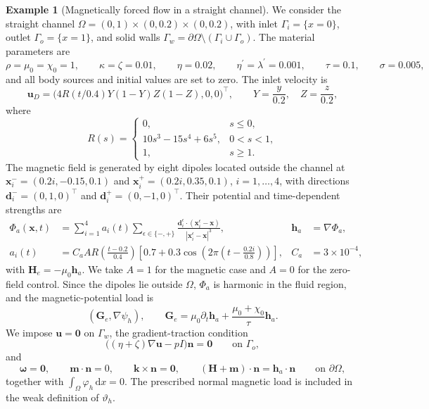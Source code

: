 \documentclass[11pt,a4paper]{article}
\newcommand{\bs}{\boldsymbol}
\theoremstyle{definition}
\newtheorem{example}{Example}
\numberwithin{equation}{section}
\begin{document}
\begin{example}[Magnetically forced flow in a straight channel]\label{ex:str-cha}
We consider the straight channel
\(\Omega=(0,1)\times(0,0.2)\times(0,0.2)\), with inlet
\(\Gamma_i=\{x=0\}\), outlet \(\Gamma_o=\{x=1\}\), and solid walls
\(\Gamma_w=\partial\Omega\setminus(\Gamma_i\cup\Gamma_o)\). The material
parameters are
\[
\rho=\mu_0=\chi_0=1,\qquad
\kappa=\zeta=0.01,\qquad
\eta=0.02,\qquad
\eta^\prime=\lambda^\prime=0.001,\qquad
\tau=0.1,\qquad
\sigma=0.005,
\]
and all body sources and initial values are set to zero. The inlet velocity is
\[
\bs u_D
=
\bigl(4R(t/0.4)Y(1-Y)Z(1-Z),0,0\bigr)^\intercal,
\qquad
Y=\frac{y}{0.2},\quad Z=\frac{z}{0.2},
\]
where
\[
R(s)=
\begin{cases}
0,&s\le0,\\
10s^3-15s^4+6s^5,&0<s<1,\\
1,&s\ge1.
\end{cases}
\]
The magnetic field is generated by eight dipoles located outside the channel at
\(\bs x_i^-=(0.2i,-0.15,0.1)\) and
\(\bs x_i^+=(0.2i,0.35,0.1)\), \(i=1,\ldots,4\), with directions
\(\bs d_i^-=(0,1,0)^\intercal\) and
\(\bs d_i^+=(0,-1,0)^\intercal\). Their potential and time-dependent strengths
are
%
\begin{align}
 \Phi_a(\bs x,t)
 &=\sum_{i=1}^4 a_i(t)
   \sum_{\epsilon\in\{-,+\}}
   \frac{\bs d_i^{\epsilon}\cdot(\bs x_i^{\epsilon}-\bs x)}
   {|\bs x_i^{\epsilon}-\bs x|^3},
 &\bs h_a&=\nabla\Phi_a,\label{eq:channel-dipoles}\\
 a_i(t)
 &=C_a A R\!\left(\frac{t-0.2}{0.4}\right)
 \left[0.7+0.3\cos\!\left(2\pi\left(t-\frac{0.2i}{0.8}\right)\right)\right],
 &C_a&=3\times10^{-4},\label{eq:channel-pulse}
\end{align}
with \(\bs H_e=-\mu_0\bs h_a\). We take
\(A=1\) for the magnetic case and \(A=0\) for the zero-field control. Since the
dipoles lie outside \(\Omega\), \(\Phi_a\) is harmonic in the fluid region,
and the magnetic-potential load is
\[
(\bs G_e,\nabla\psi_h),
\qquad
\bs G_e
=
\mu_0\partial_t\bs h_a
+
\frac{\mu_0+\chi_0}{\tau}\bs h_a.
\]
We impose \(\bs u=\bs0\) on \(\Gamma_w\), the gradient-traction condition
\[
\bigl((\eta+\zeta)\nabla\bs u-pI\bigr)\bs n=\bs0
\qquad\text{on }\Gamma_o,
\]
and
\[
\bs\omega=\bs0,\qquad
\bs m\cdot\bs n=0,\qquad
\bs k\times\bs n=\bs0,\qquad
(\bs H+\bs m)\cdot\bs n=\bs h_a\cdot\bs n
\qquad\text{on }\partial\Omega,
\]
together with \(\int_{\Omega}\varphi_h\,\mathrm dx=0\). The prescribed normal
magnetic load is included in the weak definition of \(\vartheta_h\). 



\end{example}
\end{document}

